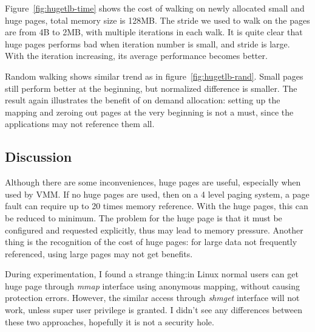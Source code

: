 Figure~\ref{fig:hugetlb-time} shows the cost of walking on newly allocated
small and huge pages, total memory size is 128MB. The stride we used to walk on
the pages are from 4B to 2MB, with multiple iterations in each walk. It is quite
clear that huge pages performs bad when iteration number is small, and stride
is large. With the iteration increasing, its average performance becomes better.

Random walking shows similar trend as in figure~\ref{fig:hugetlb-rand}. Small
pages still perform better at the beginning, but normalized difference is
smaller. The result again illustrates the benefit of on demand allocation:
setting up the mapping and zeroing out pages at the very beginning is not a must, since the applications may not reference them all.

\subsection{Discussion}
Although there are some inconveniences, huge pages are useful, especially
when used by VMM. If no huge pages are used, then on a 4 level paging system, a
page fault can require up to 20 times memory reference. With the huge pages,
this can be reduced to minimum. The problem for the huge page is that it must
be configured and requested explicitly, thus may lead to memory pressure.
Another thing is the recognition of the cost of huge pages: for large data not
frequently referenced, using large pages may not get benefits.

During experimentation, I found a strange thing:in Linux normal users can get
huge page through \emph{mmap} interface using anonymous mapping, without
causing protection errors. However, the similar access through \emph{shmget}
interface will not work, unless super user privilege is granted. I didn't see
any differences between these two approaches, hopefully it is not a security hole.
